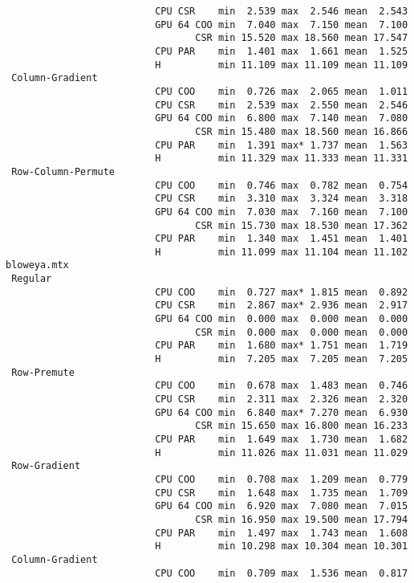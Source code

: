 {\begin{verbatim}
                          CPU CSR    min  2.539 max  2.546 mean  2.543
                          GPU 64 COO min  7.040 max  7.150 mean  7.100
                                 CSR min 15.520 max 18.560 mean 17.547
                          CPU PAR    min  1.401 max  1.661 mean  1.525
                          H          min 11.109 max 11.109 mean 11.109
 Column-Gradient
                          CPU COO    min  0.726 max  2.065 mean  1.011
                          CPU CSR    min  2.539 max  2.550 mean  2.546
                          GPU 64 COO min  6.800 max  7.140 mean  7.080
                                 CSR min 15.480 max 18.560 mean 16.866
                          CPU PAR    min  1.391 max* 1.737 mean  1.563
                          H          min 11.329 max 11.333 mean 11.331
 Row-Column-Permute
                          CPU COO    min  0.746 max  0.782 mean  0.754
                          CPU CSR    min  3.310 max  3.324 mean  3.318
                          GPU 64 COO min  7.030 max  7.160 mean  7.100
                                 CSR min 15.730 max 18.530 mean 17.362
                          CPU PAR    min  1.340 max  1.451 mean  1.401
                          H          min 11.099 max 11.104 mean 11.102
bloweya.mtx
 Regular
                          CPU COO    min  0.727 max* 1.815 mean  0.892
                          CPU CSR    min  2.867 max* 2.936 mean  2.917
                          GPU 64 COO min  0.000 max  0.000 mean  0.000
                                 CSR min  0.000 max  0.000 mean  0.000
                          CPU PAR    min  1.680 max* 1.751 mean  1.719
                          H          min  7.205 max  7.205 mean  7.205
 Row-Premute
                          CPU COO    min  0.678 max  1.483 mean  0.746
                          CPU CSR    min  2.311 max  2.326 mean  2.320
                          GPU 64 COO min  6.840 max* 7.270 mean  6.930
                                 CSR min 15.650 max 16.800 mean 16.233
                          CPU PAR    min  1.649 max  1.730 mean  1.682
                          H          min 11.026 max 11.031 mean 11.029
 Row-Gradient
                          CPU COO    min  0.708 max  1.209 mean  0.779
                          CPU CSR    min  1.648 max  1.735 mean  1.709
                          GPU 64 COO min  6.920 max  7.080 mean  7.015
                                 CSR min 16.950 max 19.500 mean 17.794
                          CPU PAR    min  1.497 max  1.743 mean  1.608
                          H          min 10.298 max 10.304 mean 10.301
 Column-Gradient
                          CPU COO    min  0.709 max  1.536 mean  0.817

\end{verbatim}}

